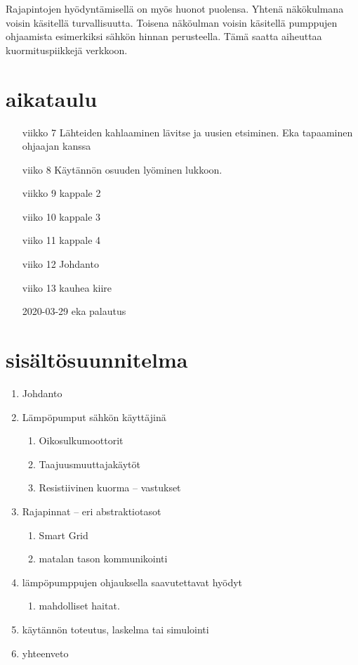   Rajapintojen hyödyntämisellä on myös huonot puolensa. Yhtenä näkökulmana voisin käsitellä turvallisuutta. Toisena näköulman voisin käsitellä pumppujen ohjaamista esimerkiksi sähkön hinnan perusteella. Tämä saatta aiheuttaa kuormituspiikkejä verkkoon.

\section{aikataulu}
  \begin{itemize}
    \item[viikko 7] Lähteiden kahlaaminen lävitse ja uusien etsiminen. Eka tapaaminen ohjaajan kanssa
    \item[viiko 8] Käytännön osuuden lyöminen lukkoon.
    \item[viikko 9] kappale 2
    \item[viiko 10] kappale 3
    \item[viiko 11] kappale 4
    \item[viiko 12] Johdanto
    \item[viiko 13] kauhea kiire
    \item[2020-03-29] eka palautus
  \end{itemize}


\section{sisältösuunnitelma}

\begin{enumerate}
  \item Johdanto
  \item Lämpöpumput sähkön käyttäjinä
    \begin{enumerate}
      \item Oikosulkumoottorit
      \item Taajuusmuuttajakäytöt
      \item Resistiivinen kuorma -- vastukset
    \end{enumerate}
  \item Rajapinnat -- eri abstraktiotasot
  \begin{enumerate}
    \item Smart Grid
    \item matalan tason kommunikointi
  \end{enumerate}
  \item lämpöpumppujen ohjauksella saavutettavat hyödyt
  \begin{enumerate}
    \item mahdolliset haitat.
  \end{enumerate}
  \item käytännön toteutus, laskelma tai simulointi
  \item yhteenveto
\end{enumerate}



